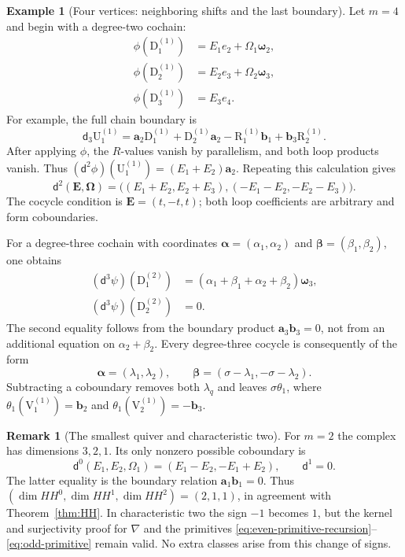 \documentclass[a4paper,11pt,oneside,reqno]{amsart}
\theoremstyle{definition}
\newtheorem{example}[theorem]{Example}
\newtheorem{remark}[theorem]{Remark}
\numberwithin{equation}{section}
\begin{document}
	\begin{example}[Four vertices: neighboring shifts and the last boundary]
		\label{ex:HH-m4}
		Let $m=4$ and begin with a degree-two cochain:
		\[
		\begin{aligned}
			\phi(\mathrm{D}_1^{(1)})&=E_1e_2+\Omega_1\boldsymbol{\omega}_2,\\
			\phi(\mathrm{D}_2^{(1)})&=E_2e_3+\Omega_2\boldsymbol{\omega}_3,\\
			\phi(\mathrm{D}_3^{(1)})&=E_3e_4.
		\end{aligned}
		\]
		For example, the full chain boundary is
		\[
		\mathsf d_3\mathrm{U}_1^{(1)}=\mathbf{a}_2\mathrm{D}_1^{(1)}+\mathrm{D}_2^{(1)}\mathbf{a}_2
		-\mathrm{R}_1^{(1)}\mathbf{b}_1+\mathbf{b}_3\mathrm{R}_2^{(1)}.
		\]
		After applying $\phi$, the $R$-values vanish by parallelism, and both
		loop products vanish.  Thus $(\mathsf d^2\phi)(\mathrm{U}_1^{(1)})=(E_1+E_2)\mathbf{a}_2$.
		Repeating this calculation gives
		\[
		\mathsf d^2(\mathbf E,\boldsymbol\Omega)
		=\bigl((E_1+E_2,E_2+E_3),(-E_1-E_2,-E_2-E_3)\bigr).
		\]
		The cocycle condition is $\mathbf E=(t,-t,t)$; both loop coefficients
		are arbitrary and form coboundaries.
		
		For a degree-three cochain with coordinates
		$\boldsymbol\alpha=(\alpha_1,\alpha_2)$ and
		$\boldsymbol\beta=(\beta_1,\beta_2)$, one obtains
		\[
		\begin{aligned}
			(\mathsf d^3\psi)(\mathrm{D}_1^{(2)})
			&=(\alpha_1+\beta_1+\alpha_2+\beta_2)\boldsymbol{\omega}_3,\\
			(\mathsf d^3\psi)(\mathrm{D}_2^{(2)})&=0.
		\end{aligned}
		\]
		The second equality follows from the boundary product $\mathbf{a}_3\mathbf{b}_3=0$,
		not from an additional equation on $\alpha_2+\beta_2$.
		Every degree-three cocycle is consequently of the form
		\[
		\boldsymbol\alpha=(\lambda_1,\lambda_2),\qquad
		\boldsymbol\beta=(\sigma-\lambda_1,-\sigma-\lambda_2).
		\]
		Subtracting a coboundary removes both $\lambda_q$ and leaves
		$\sigma\theta_1$, where
		$\theta_1(\mathrm{V}_1^{(1)})=\mathbf{b}_2$ and $\theta_1(\mathrm{V}_2^{(1)})=-\mathbf{b}_3$.
	\end{example}
	
	\begin{remark}[The smallest quiver and characteristic two]
		For $m=2$ the complex has dimensions $3,2,1$.
		Its only nonzero possible coboundary is
		\[
		\mathsf d^0(E_1,E_2,\Omega_1)=(E_1-E_2,-E_1+E_2),
		\qquad\mathsf d^1=0.
		\]
		The latter equality is the boundary relation $\mathbf{a}_1\mathbf{b}_1=0$.
		Thus $(\dim HH^0,\dim HH^1,\dim HH^2)=(2,1,1)$, in agreement with
		Theorem~\ref{thm:HH}.  In characteristic two the sign $-1$ becomes $1$,
		but the kernel and surjectivity proof for $\nabla$ and the primitives
		\eqref{eq:even-primitive-recursion}--\eqref{eq:odd-primitive} remain
		valid.  No extra classes arise from this change of signs.
	\end{remark}
	
\end{document}
